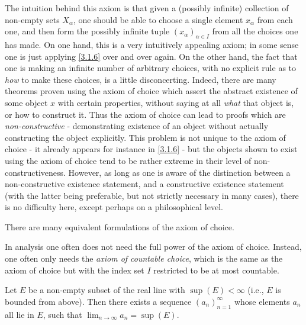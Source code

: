 \begin{rmk}\label{8.4.3}
  The intuition behind this axiom is that given a (possibly infinite) collection of non-empty sets \(X_{\alpha}\), one should be able to choose a single element \(x_{\alpha}\) from each one, and then form the possibly infinite tuple \((x_{\alpha})_{\alpha \in I}\) from all the choices one has made.
  On one hand, this is a very intuitively appealing axiom;
  in some sense one is just applying \cref{3.1.6} over and over again.
  On the other hand, the fact that one is making an infinite number of arbitrary choices, with no explicit rule as to \emph{how} to make these choices, is a little disconcerting.
  Indeed, there are many theorems proven using the axiom of choice which assert the abstract existence of some object \(x\) with certain properties, without saying at all \emph{what} that object is, or how to construct it.
  Thus the axiom of choice can lead to proofs which are \emph{non-constructive} - demonstrating existence of an object without actually constructing the object explicitly.
  This problem is not unique to the axiom of choice - it already appears for instance in \cref{3.1.6} - but the objects shown to exist using the axiom of choice tend to be rather extreme in their level of non-constructiveness.
  However, as long as one is aware of the distinction between a non-constructive existence statement, and a constructive existence statement (with the latter being preferable, but not strictly necessary in many cases), there is no difficulty here, except perhaps on a philosophical level.
\end{rmk}

\begin{rmk}\label{8.4.4}
  There are many equivalent formulations of the axiom of choice.
\end{rmk}

\begin{note}
  In analysis one often does not need the full power of the axiom of choice.
  Instead, one often only needs the \emph{axiom of countable choice}, which is the same as the axiom of choice but with the index set \(I\) restricted to be at most countable.
\end{note}

\begin{lem}\label{8.4.5}
  Let \(E\) be a non-empty subset of the real line with \(\sup(E) < \infty\)
  (i.e., \(E\) is bounded from above).
  Then there exists a sequence \((a_n)_{n = 1}^\infty\) whose elements \(a_n\) all lie in \(E\), such that \(\lim_{n \to \infty} a_n = \sup(E)\).
\end{lem}

